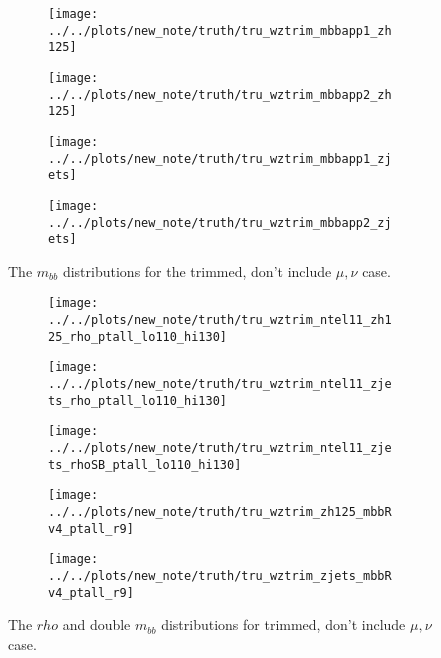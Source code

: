 \begin{figure}[!htbp]\captionsetup{justification=centering}
\begin{center}
\begin{subfigure}[t]{18pc}\centering\texttt{[image: ../../plots/new\_note/truth/tru\_wztrim\_mbbapp1\_zh125]}\caption{}\end{subfigure}
\begin{subfigure}[t]{18pc}\centering\texttt{[image: ../../plots/new\_note/truth/tru\_wztrim\_mbbapp2\_zh125]}\caption{}\end{subfigure}
\begin{subfigure}[t]{18pc}\centering\texttt{[image: ../../plots/new\_note/truth/tru\_wztrim\_mbbapp1\_zjets]}\caption{}\end{subfigure}
\begin{subfigure}[t]{18pc}\centering\texttt{[image: ../../plots/new\_note/truth/tru\_wztrim\_mbbapp2\_zjets]}\caption{}\end{subfigure}
\caption{\label{fig:mbbwztrim}The $m_{bb}$ distributions for the trimmed, don't include $\mu,\nu$ case.}
\end{center}
\end{figure}
\begin{figure}[!htbp]\captionsetup{justification=centering}
\begin{center}
\begin{subfigure}[t]{18pc}\centering\texttt{[image: ../../plots/new\_note/truth/tru\_wztrim\_ntel11\_zh125\_rho\_ptall\_lo110\_hi130]}\caption{}\end{subfigure}
\begin{subfigure}[t]{18pc}\centering\texttt{[image: ../../plots/new\_note/truth/tru\_wztrim\_ntel11\_zjets\_rho\_ptall\_lo110\_hi130]}\caption{}\end{subfigure}
\begin{subfigure}[t]{18pc}\centering\texttt{[image: ../../plots/new\_note/truth/tru\_wztrim\_ntel11\_zjets\_rhoSB\_ptall\_lo110\_hi130]}\caption{}\end{subfigure}
\begin{subfigure}[t]{18pc}\centering\texttt{[image: ../../plots/new\_note/truth/tru\_wztrim\_zh125\_mbbRv4\_ptall\_r9]}\caption{}\end{subfigure}
\begin{subfigure}[t]{18pc}\centering\texttt{[image: ../../plots/new\_note/truth/tru\_wztrim\_zjets\_mbbRv4\_ptall\_r9]}\caption{}\end{subfigure}
\caption{\label{fig:mbbwztrim}The $rho$ and double $m_{bb}$ distributions for trimmed, don't include $\mu,\nu$ case.}
\end{center}
\end{figure}

